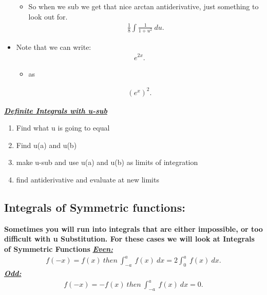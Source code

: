 \documentclass{report}
\begin{document}
\begin{itemize}
\begin{itemize}
          \item So when we sub we get that nice arctan antiderivative, just something to look out for.
            \begin{align*}
              \frac{1}{8}\int \frac{1}{1+u^{2}}\ du
            .\end{align*}
            \end{itemize}
          \item Note that we can write:
            \begin{align*}
              e^{2x}
            .\end{align*}
            \begin{itemize}
              \item as 
            \end{itemize}
            \begin{align*}
              (e^{x})^{2}
            .\end{align*}
      \end{itemize}

      \bigbreak \noindent \bigbreak \noindent
       \textbf{\textit{\underline{Definite Integrals with u-sub}}} 
      \begin{enumerate}
        \item Find what u is going to equal
        \item Find u(a) and u(b) 
        \item make u-sub and use u(a) and u(b) as limits of integration
        \item find antiderivative and evaluate at new limits
      \end{enumerate}
      \bigbreak \noindent 


      \pagebreak \bigbreak \noindent
      \subsection{Integrals of Symmetric functions:}
      \bigbreak \noindent \bigbreak \noindent
      \textbf{Sometimes you will run into integrals that are either impossible, or too difficult with u Substitution. For these cases we will look at Integrals of Symmetric Functions}
      \bigbreak \noindent \bigbreak \noindent
      \textbf{\textit{\underline{Even:}}} 
      \begin{align*}
        f(-x)  = f(x)\ then\ \int_{-a}^{a}\ f(x)\ dx  = 2 \int_{0}^{a}\ f(x)\ dx
      .\end{align*}
      \bigbreak \noindent \bigbreak \noindent
      \textbf{\textit{\underline{Odd:}}}
      \begin{align*}
        f(-x) = -f(x)\ then\ \int_{-a}^{a}\ f(x)\ dx = 0
      .\end{align*}
\end{document}
